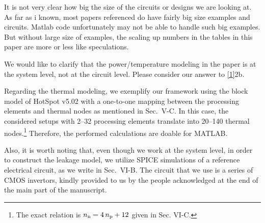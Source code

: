 \begin{reviewer}
It is not very clear how big the size of the circuits or designs we are looking at.
As far as i known, most papers referenced do have fairly big size examples and circuits. Matlab code unfortunately may not be able to handle such big examples.
But without large size of examples, the scaling up numbers in the tables in this paper are more or less like speculations.
\end{reviewer}
\begin{authors}
We would like to clarify that the power/temperature modeling in the paper is at the system level, not at the circuit level.
Please consider our answer to \cref{1}{2b}.

Regarding the thermal modeling, we exemplify our framework using the block model of HotSpot v5.02 with a one-to-one mapping between the processing elements and thermal nodes as mentioned in Sec.~V-C.
In this case, the considered setups with 2--32 processing elements translate into 20--140 thermal nodes.\footnote{The exact relation is ${n_\text{n}} = 4 \, {n_\text{p}} + 12$ given in Sec. VI-C.}
Therefore, the performed calculations are doable for MATLAB.

Also, it is worth noting that, even though we work at the system level, in order to construct the leakage model, we utilize SPICE simulations of a reference electrical circuit, as we write in Sec.~VI-B.
The circuit that we use is a series of CMOS invertors, kindly provided to us by the people acknowledged at the end of the main part of the manuscript.

\begin{actions}
\end{actions}
\end{authors}

